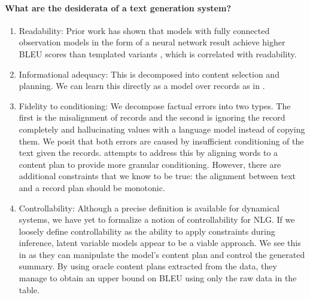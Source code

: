 \documentclass[11pt]{article}
\begin{document}
\paragraph{What are the desiderata of a text generation system?}
\begin{enumerate}
\item Readability: Prior work has shown that models with fully connected observation models
in the form of a neural network result achieve higher BLEU scores than templated variants \citep{wiseman2017d2t},
which is correlated with readability.
\item Informational adequacy: This is decomposed into content selection and planning.
We can learn this directly as a model over
records as in \citep{puduppully2018contentselection}.
\item Fidelity to conditioning: We decompose factual errors into two types.
The first is the misalignment of records and the second is ignoring the record
completely and hallucinating values with a language model instead of copying them.
We posit that both errors are caused by insufficient conditioning of the
text given the records.
\citep{puduppully2018contentselection} attempts to address this by aligning
words to a content plan to provide more granular conditioning.
However, there are additional constraints that we know to be true:
the alignment between text and a record plan should be monotonic.
\item Controllability: 
Although a precise definition is available for dynamical systems,
we have yet to formalize a notion of controllability for NLG.
If we loosely define controllability as the ability to apply constraints during inference, 
latent variable models appear to be a viable approach.
We see this in \citep{puduppully2018contentselection}
as they can manipulate the model's content plan and control the generated summary.
By using oracle content plans extracted from the data,
they manage to obtain an upper bound on BLEU using only the raw data in the table.
\end{enumerate}
\end{document}
